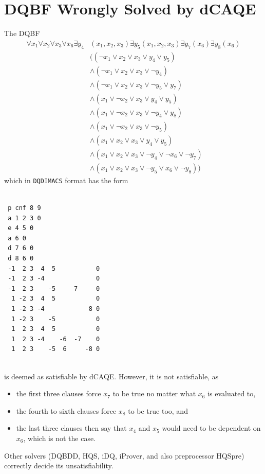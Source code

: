 \documentclass[
  digital, %
  color,
  twoside, %
  table,   %
  nolof,     %
  nolot,     %
]{fithesis3}
\theoremstyle{definition}
\theoremstyle{remark}
\newcommand{\DQDIMACS}[0]{\texttt{DQDIMACS}}
\begin{document}
\chapter{DQBF Wrongly Solved by dCAQE}
\label{appendix:wrongdcaqe}
The DQBF
\begin{equation*} 
\begin{split}
    \forall x_1 \forall x_2 \forall x_3 \forall x_6 \exists y_4 & (x_1,x_2,x_3) \exists y_5 (x_1,x_2,x_3) \exists y_7 (x_6) \exists y_8 (x_6) \\
    & ((\neg x_1 \lor x_2 \lor x_3 \lor y_4 \lor y_5) \\ 
    {} & \land (\neg x_1 \lor x_2 \lor x_3 \lor \neg y_4) \\ 
    {} & \land (\neg x_1 \lor x_2 \lor x_3 \lor \neg y_5 \lor y_7) \\
    {} & \land (x_1 \lor \neg x_2 \lor x_3 \lor y_4 \lor y_5) \\
    {} & \land (x_1 \lor \neg x_2 \lor x_3 \lor \neg y_4 \lor y_8) \\
    {} & \land (x_1 \lor \neg x_2 \lor x_3 \lor\neg y_5) \\
    {} & \land (x_1 \lor x_2 \lor x_3 \lor y_4 \lor y_5) \\
    {} & \land (x_1 \lor x_2 \lor x_3 \lor \neg y_4 \lor \neg x_6 \lor \neg y_7) \\
    {} & \land (x_1 \lor x_2 \lor x_3 \lor \neg y_5 \lor x_6 \lor \neg y_8))
\end{split}
\end{equation*}
which in \DQDIMACS{} format has the form
\begin{verbatim}

 p cnf 8 9
 a 1 2 3 0
 e 4 5 0
 a 6 0
 d 7 6 0
 d 8 6 0
 -1  2 3  4  5           0
 -1  2 3 -4              0
 -1  2 3    -5     7     0
  1 -2 3  4  5           0
  1 -2 3 -4            8 0
  1 -2 3    -5           0
  1  2 3  4  5           0
  1  2 3 -4    -6  -7    0
  1  2 3    -5  6     -8 0
 
\end{verbatim}
is deemed as satisfiable by dCAQE. However, it is not satisfiable, as
\begin{itemize}
    \item the first three clauses force $x_7$ to be true no matter what $x_6$ is evaluated to,
    \item the fourth to sixth clauses force $x_8$ to be true too, and \item the last three clauses then say that $x_4$ and $x_5$ would need to be dependent on $x_6$, which is not the case.
\end{itemize}
Other solvers (DQBDD, HQS, iDQ, iProver, and also preprocessor HQSpre) correctly decide its unsatisfiability.
\end{document}
